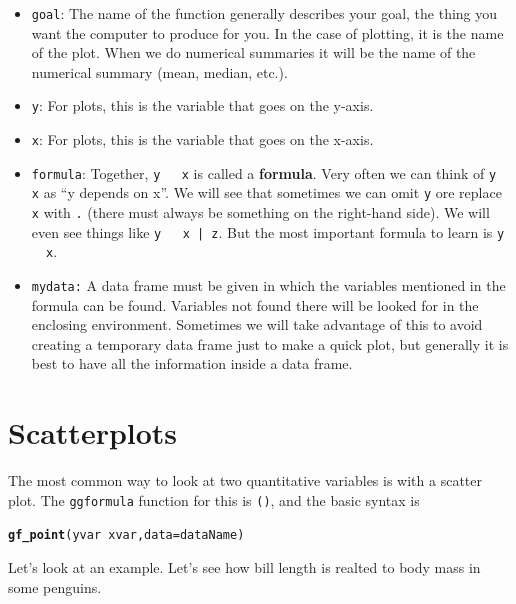 \documentclass[twoside]{book}\usepackage[]{graphicx}\usepackage[]{xcolor}
\makeatletter
\newcommand{\hlopt}[1]{\textcolor[rgb]{0,0,0}{#1}}%
\newcommand{\hlstd}[1]{\textcolor[rgb]{0.345,0.345,0.345}{#1}}%
\newcommand{\hlkwc}[1]{\textcolor[rgb]{0.333,0.667,0.333}{#1}}%
\newcommand{\hlkwd}[1]{\textcolor[rgb]{0.737,0.353,0.396}{\textbf{#1}}}%
\newenvironment{kframe}{%
 \def\at@end@of@kframe{}%
 \ifinner\ifhmode%
  \def\at@end@of@kframe{\end{minipage}}%
  \begin{minipage}{\columnwidth}%
 \fi\fi%
 \def\FrameCommand##1{\hskip\@totalleftmargin \hskip-\fboxsep
 \colorbox{shadecolor}{##1}\hskip-\fboxsep
     \hskip-\linewidth \hskip-\@totalleftmargin \hskip\columnwidth}%
 \MakeFramed {\advance\hsize-\width
   \@totalleftmargin\z@ \linewidth\hsize
   \@setminipage}}%
 {\par\unskip\endMakeFramed%
 \at@end@of@kframe}
\newenvironment{knitrout}{}{} %
\newcommand{\Rindex}[1]{\index{\texttt{#1}}}
\newcommand{\function}[1]{{\color{purple!75!blue}\texttt{\StrSubstitute{#1}{()}{}()}}\Rindex{#1}}
\newcommand{\pkg}[1]{{\color{red!80!black}\texttt{#1}}\Rindex{#1}}
\def\term#1{\textbf{#1}}
\newcounter{example}[section]
\makeatother
\begin{document}
\begin{itemize}
	\item \texttt{goal}: The name of the function generally describes your goal, 
		the thing you want the computer to produce for you.  In the case of plotting,
		it is the name of the plot.  When we do numerical summaries it will be the 
		name of the numerical summary (mean, median, etc.).
	\item \texttt{y}: For plots, this is the variable that goes on the y-axis. 
	\item \texttt{x}: For plots, this is the variable that goes on the x-axis. 
	\item
		\texttt{formula}: Together, \texttt{y ~ x} is called a \term{formula}.
		Very often we can think of \texttt{y ~ x} as ``y depends on x''.
		We will see that sometimes we can omit \texttt{y} ore replace \texttt{x} with \texttt{.} (there must
		always be something on the right-hand side).  We will even see things like 
		\texttt{y ~ x | z}.  But the most important formula to learn is \texttt{y ~ x}.
	\item
		\texttt{mydata:} A data frame must be given in which the variables mentioned in
		the formula can be found.  Variables not found there will be looked for in the 
		enclosing environment.  Sometimes we will take advantage of this to avoid creating
		a temporary data frame just to make a quick plot, but generally it is best to have
		all the information inside a data frame.
\end{itemize}


\section{Scatterplots}

The most common way to look at two quantitative variables is with a 
scatter plot.  The \pkg{ggformula} function for this is \function{gf_point()}, 
and the basic syntax is

\begin{knitrout}
\color{fgcolor}\begin{kframe}
\begin{alltt}
\hlkwd{gf_point}\hlstd{( yvar} \hlopt{~} \hlstd{xvar,} \hlkwc{data} \hlstd{= dataName)}
\end{alltt}
\end{kframe}
\end{knitrout}

Let's look at an example. Let's see how bill length is realted to body mass in some penguins.
\end{document}
